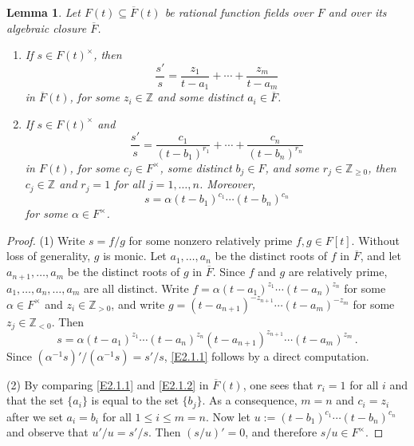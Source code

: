 \documentclass[12pt]{amsart}
\theoremstyle{plain}
\newtheorem{lemma}[theorem]{Lemma}
\numberwithin{theorem}{section}
\numberwithin{equation}{theorem}
\theoremstyle{definition}
\newcommand{\ZZ}{\mathbb{Z}}
\newcommand \Znn {\ZZ_{\ge 0}}
\begin{document}
\begin{lemma}  
\label{zzlem2.1} 
Let $F(t) \subseteq \overline{F}(t)$ be 
rational function fields over $F$ and 
over its algebraic closure $\overline{F}$.
\begin{enumerate}
\item[(1)]
If $s \in F(t)^\times$, then
\begin{equation} 
\label{E2.1.1}\tag{E2.1.1}
\dfrac{s'}{s} 
= \frac{z_1}{t-a_1} + \cdots + \frac{z_m}{t-a_m}
\end{equation}
in $\overline{F}(t)$, for some $z_i \in \ZZ$
and some distinct $a_i \in \overline{F}$.
\item[(2)]
If $s \in F(t)^\times$ and
\begin{equation} 
\label{E2.1.2}\tag{E2.1.2}
\dfrac{s'}{s} = \frac{c_1}{(t-b_1)^{r_1}} 
+ \cdots + \frac{c_n}{(t-b_n)^{r_n}}
\end{equation}
in $F(t)$, for some $c_j \in F^\times$, 
some distinct $b_j \in F$, and some 
$r_j \in \Znn$, then $c_j \in \ZZ$ 
and $r_j = 1$ for all $j=1,\dots,n$. 
Moreover,
$$s = \alpha (t-b_1)^{c_1} \cdots (t-b_n)^{c_n}$$
for some $\alpha \in F^\times$.
\end{enumerate}
\end{lemma}

\begin{proof} 
(1) Write $s = f/g$ for some nonzero relatively
prime $f,g \in F[t]$. Without loss of
generality, $g$ is monic. Let $a_1,\dots,a_n$ 
be the distinct roots of $f$ in $\overline{F}$, 
and let $a_{n+1},\dots,a_m$ be the distinct 
roots of $g$ in $\overline{F}$. Since $f$ 
and $g$ are relatively prime, 
$a_1,\dots,a_n,\dots,a_m$ are all
distinct. Write 
$f = \alpha (t-a_1)^{z_1} \cdots (t-a_n)^{z_n}$
for some 
$\alpha \in F^\times$ and $z_i \in \ZZ_{>0}$, 
and write 
$g = (t-a_{n+1})^{-z_{n+1}} \cdots 
(t-a_m)^{-z_m}$ for some $z_j \in \ZZ_{<0}$.
Then
$$s = \alpha (t-a_1)^{z_1} 
\cdots (t-a_n)^{z_n} (t-a_{n+1})^{z_{n+1}} 
\cdots (t-a_m)^{z_m}\,.$$
Since $(\alpha^{-1}s)'/(\alpha^{-1}s) = s'/s$, 
\eqref{E2.1.1} follows by a direct computation.

(2) By comparing \eqref{E2.1.1} and 
\eqref{E2.1.2}
in $\overline{F}(t)$, one sees that $r_i=1$ 
for all $i$ and that the set $\{a_i\}$ is 
equal to the set $\{b_j\}$. As a consequence,
$m=n$ and $c_i=z_i$ after we set $a_i=b_i$
for all $1\leq i\leq m=n$. Now let 
$u := (t-b_1)^{c_1} \cdots (t-b_n)^{c_n}$ and 
observe that $u'/u = s'/s$. Then $(s/u)'=0$,
and therefore $s/u \in F^\times$.
\end{proof}
\end{document}
